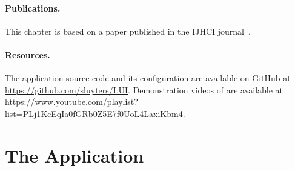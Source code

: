 \paragraph{Publications.} This chapter is based on a paper published in the IJHCI journal~\cite{Sluyters:2022:LUI}.

\paragraph{Resources.} The \lui application source code and its \ql configuration are available on GitHub at \url{https://github.com/sluyters/LUI}. Demonstration videos of \lui are available at \url{https://www.youtube.com/playlist?list=PLj1KcEqIa0fGRb0Z5E7f0UoL4LaxiKbm4}.

\section{The \lui Application} \label{sec:lui:description}

